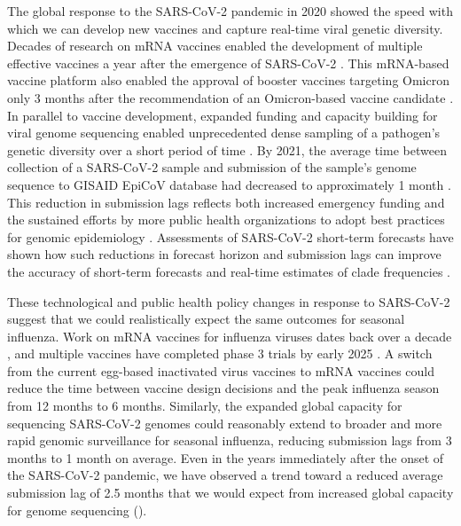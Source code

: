 \documentclass[9pt,lineno]{elife}
\begin{document}
The global response to the SARS-CoV-2 pandemic in 2020 showed the speed with which we can develop new vaccines and capture real-time viral genetic diversity.
Decades of research on mRNA vaccines enabled the development of multiple effective vaccines a year after the emergence of SARS-CoV-2 \citep{Mulligan2020,Baden2021}.
This mRNA-based vaccine platform also enabled the approval of booster vaccines targeting Omicron only 3 months after the recommendation of an Omicron-based vaccine candidate \citep{Grant2023}.
In parallel to vaccine development, expanded funding and capacity building for viral genome sequencing enabled unprecedented dense sampling of a pathogen's genetic diversity over a short period of time \citep{Chen2022}.
By 2021, the average time between collection of a SARS-CoV-2 sample and submission of the sample's genome sequence to GISAID EpiCoV database had decreased to approximately 1 month \citep{Brito2022}.
This reduction in submission lags reflects both increased emergency funding and the sustained efforts by more public health organizations to adopt best practices for genomic epidemiology \citep{Kalia2021,Black2020}.
Assessments of SARS-CoV-2 short-term forecasts have shown how such reductions in forecast horizon and submission lags can improve the accuracy of short-term forecasts and real-time estimates of clade frequencies \citep{Abousamra2023}.

These technological and public health policy changes in response to SARS-CoV-2 suggest that we could realistically expect the same outcomes for seasonal influenza.
Work on mRNA vaccines for influenza viruses dates back over a decade \citep{Petsch2012,Brazzoli2016,Pardi2018,Feldman2019}, and multiple vaccines have completed phase 3 trials by early 2025 \citep{Soens2025,NCT05540522}.
A switch from the current egg-based inactivated virus vaccines to mRNA vaccines could reduce the time between vaccine design decisions and the peak influenza season from 12 months to 6 months.
Similarly, the expanded global capacity for sequencing SARS-CoV-2 genomes could reasonably extend to broader and more rapid genomic surveillance for seasonal influenza, reducing submission lags from 3 months to 1 month on average.
Even in the years immediately after the onset of the SARS-CoV-2 pandemic, we have observed a trend toward a reduced average submission lag of 2.5 months that we would expect from increased global capacity for genome sequencing ().
\end{document}
